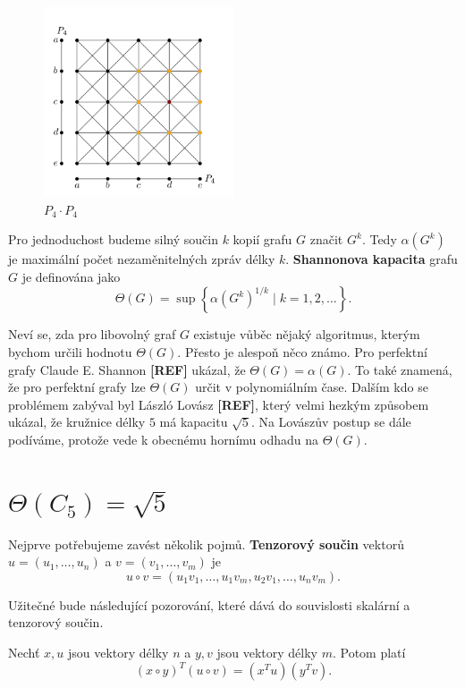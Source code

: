 \begin{figure}[h!]
    \centering
    \includegraphics[width=0.5\textwidth]{img/strong_product_P4_P4.png}   
    \caption{$P_4 \cdot P_4$}
    \label{fig:strong_product_P4_P4}
\end{figure}

Pro jednoduchost budeme silný součin $k$ kopií grafu $G$ značit $G^k$. Tedy $\alpha(G^k)$ je maximální počet nezaměnitelných zpráv délky $k$. \textbf{Shannonova kapacita} grafu $G$ je definována jako
$$
    \Theta(G) = \sup \left\{ \alpha(G^k)^{1/k} \mid k = 1, 2, \dots \right\}.
$$

Neví se, zda pro libovolný graf $G$ existuje vůběc nějaký algoritmus, kterým bychom určili hodnotu $\Theta(G)$. Přesto je alespoň něco známo. Pro perfektní grafy Claude E. Shannon \textbf{[REF]} ukázal, že $\Theta(G) = \alpha(G)$. To také znamená, že pro perfektní grafy lze $\Theta(G)$ určit v polynomiálním čase. Dalším kdo se problémem zabýval byl László Lovász \textbf{[REF]}, který velmi hezkým způsobem ukázal, že kružnice délky $5$ má kapacitu $\sqrt{5}$. Na Lovászův postup se dále podíváme, protože vede k obecnému hornímu odhadu na $\Theta(G)$.

\section{$\Theta(C_5) = \sqrt{5}$}

Nejprve potřebujeme zavést několik pojmů. \textbf{Tenzorový součin} vektorů $u = \left(u_1, \dots, u_n \right)$ a $v = \left(v_1, \dots, v_m \right)$ je
$$
    u \circ v = \left( u_1 v_1, \dots, u_1 v_m, u_2 v_1, \dots, u_n v_m \right).
$$

Užitečné bude následující pozorování, které dává do souvislosti skalární a tenzorový součin.

\begin{pz}
    Nechť $x, u$ jsou vektory délky $n$ a $y, v$ jsou vektory délky $m$. Potom platí
    \begin{equation}
        \left( x \circ y \right)^T \left( u \circ v \right) = \left( x^T u \right) \left( y^T v \right).
        \label{eq:tensor_scalar_product}
    \end{equation}
\end{pz}

